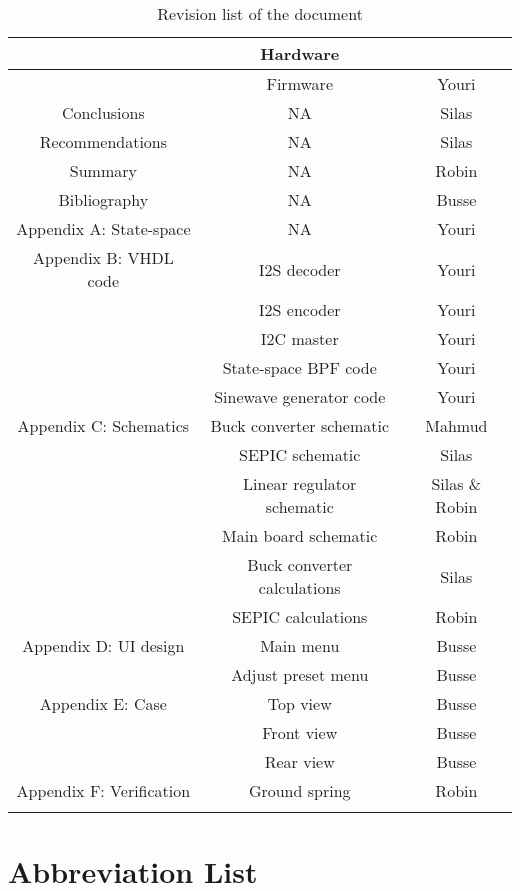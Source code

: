 \begin{justify}
\begin{longtable}{|c|c|c|}
								& Hardware						& 					\\ \hline
								& Firmware						& Youri				\\ \hline
	Conclusions					& NA							& Silas				\\ \hline
	Recommendations				& NA							& Silas				\\ \hline
	Summary						& NA							& Robin				\\ \hline
	Bibliography				& NA							& Busse				\\ \hline
	Appendix A: State-space		& NA							& Youri				\\ \hline
	Appendix B: VHDL code		& I2S decoder					& Youri				\\ \hline
								& I2S encoder					& Youri				\\ \hline
								& I2C master					& Youri				\\ \hline
								& State-space BPF code			& Youri				\\ \hline
								& Sinewave generator code		& Youri				\\ \hline
	Appendix C: Schematics		& Buck converter schematic		& Mahmud			\\ \hline
								& SEPIC schematic				& Silas				\\ \hline
								& Linear regulator schematic	& Silas	\& Robin	\\ \hline
								& Main board schematic			& Robin				\\ \hline
								& Buck converter calculations	& Silas				\\ \hline
								& SEPIC calculations			& Robin				\\ \hline
	Appendix D: UI design		& Main menu						& Busse				\\ \hline
								& Adjust preset menu			& Busse				\\ \hline
	Appendix E: Case			& Top view						& Busse				\\ \hline
								& Front view					& Busse				\\ \hline
								& Rear view						& Busse				\\ \hline
	Appendix F: Verification	& Ground spring					& Robin				\\ \hline

	\caption{Revision list of the document}
	\label{table:revision_history}
\end{longtable}

\newpage
\pagestyle{plain}
\setcounter{page}{1}

\chapter*{Abbreviation List}


\end{justify}
